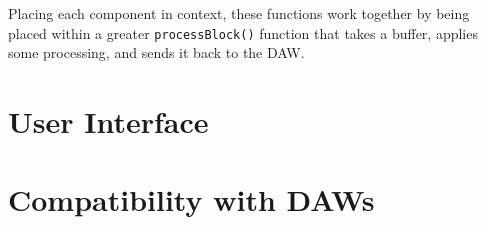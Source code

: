 \begin{singlespace}

\end{singlespace} \hfill \break
\hspace*{0.6cm}Placing each component in context, these functions work together by being placed within a greater \verb|processBlock()| function that takes a buffer, applies some processing, and sends it back to the DAW.

\section{User Interface}

\section{Compatibility with DAWs}
